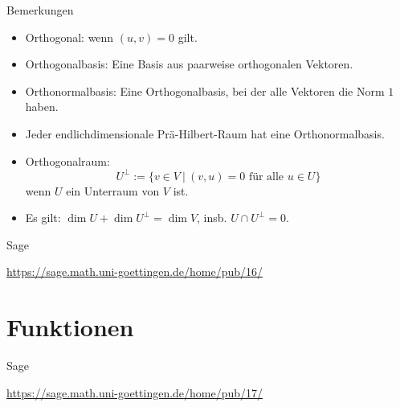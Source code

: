 \documentclass[notes=hide,hyperref={dvipdfmx,pdfpagelabels=false}]{beamer}
\begin{document}
\begin{frame}{Bemerkungen}
\begin{itemize}
\item {\color{red} Orthogonal}: wenn $(u,v)=0$ gilt.
\item {\color{red} Orthogonalbasis}: Eine Basis aus paarweise orthogonalen Vektoren. 
\item {\color{red} Orthonormalbasis}: Eine Orthogonalbasis, bei der alle Vektoren die Norm $1$
haben.
\item Jeder endlichdimensionale Prä-Hilbert-Raum hat eine
Orthonormalbasis. 
\item {\color{red} Orthogonalraum}:
\[
{U}^\perp := \{ v \in V \ | \ (v,u)=0 \mbox{ für alle } u \in U \}
\]
wenn $U$ ein Unterraum von $V$ ist.
\item Es gilt: $\dim U + \dim U^\perp = \dim V$, insb. $U \cap U^\perp = 0$.
\end{itemize}
\end{frame}


\begin{frame}{Sage}
\begin{center}
\url{https://sage.math.uni-goettingen.de/home/pub/16/}
\end{center}
\end{frame}

\section{Funktionen}

\begin{frame}{Sage}
\begin{center}
\url{https://sage.math.uni-goettingen.de/home/pub/17/}
\end{center}
\end{frame}
\end{document}
